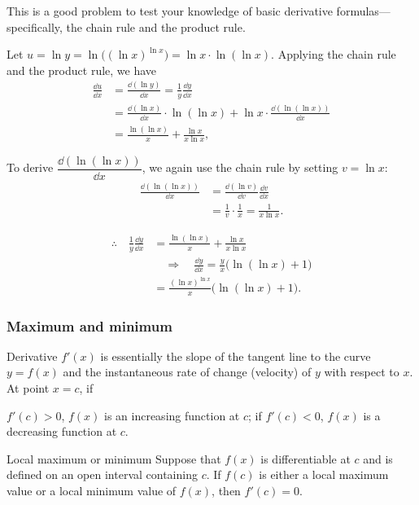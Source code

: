 \begin{solution}

This is a good problem to test your knowledge of basic derivative formulas---
specifically, the chain rule and the product rule.

Let $u=\ln y=\ln\bigl((\ln x)^{\ln x}\bigr)=\ln x\cdot\ln(\ln x)$. Applying the chain rule and the product rule,
we have
\[
\begin{aligned}
\frac{\dd u}{\dd x}&=\frac{\dd(\ln y)}{\dd x}=\frac{1}{y}\frac{\dd y}{\dd x}\\
&=\frac{\dd(\ln x)}{\dd x}\cdot\ln(\ln x)+\ln x\cdot\frac{\dd(\ln(\ln x))}{\dd x}\\
&=\frac{\ln(\ln x)}{x}+\frac{\ln x}{x\ln x},
\end{aligned}
\]

To derive $\dfrac{\dd(\ln(\ln x))}{\dd x}$, we again use the chain rule by setting $v=\ln x$:
\[
\begin{aligned}
\frac{\dd(\ln(\ln x))}{\dd x}&=\frac{\dd(\ln v)}{\dd v}\frac{\dd v}{\dd x}\\
&=\frac{1}{v}\cdot\frac{1}{x}=\frac{1}{x\ln x}.
\end{aligned}
\]

\[
\begin{aligned}
\therefore\quad
\frac{1}{y}\frac{\dd y}{\dd x}
&=\frac{\ln(\ln x)}{x}+\frac{\ln x}{x\ln x}\\
&\quad\Rightarrow\quad
\frac{\dd y}{\dd x}=\frac{y}{x}\bigl(\ln(\ln x)+1\bigr)\\
&=\frac{(\ln x)^{\ln x}}{x}\bigl(\ln(\ln x)+1\bigr).
\end{aligned}
\]

\end{solution}

\subsubsection*{Maximum and minimum}

Derivative $f'(x)$ is essentially the slope of the tangent line to the curve $y=f(x)$ and
the instantaneous rate of change (velocity) of $y$ with respect to $x$. At point $x=c$, if

$f'(c)>0$, $f(x)$ is an increasing function at $c$; if $f'(c)<0$, $f(x)$ is a decreasing
function at $c$.

\begin{concept}{Local maximum or minimum}
Suppose that $f(x)$ is differentiable at $c$ and is defined
on an open interval containing $c$. If $f(c)$ is either a local maximum value or a local
minimum value of $f(x)$, then $f'(c)=0$.
\end{concept}

